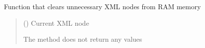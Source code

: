 \documentclass[letterpaper,10pt,english]{sphinxmanual}
\begin{document}
\begin{fulllineitems}
\label{\detokenize{geo_utilities:geo_utilities.clear_xml_node}}
\pysigstartsignatures
{}
\pysigstopsignatures
\sphinxAtStartPar
Function that clears unnecessary XML nodes from RAM memory
\begin{quote}\begin{description}
\sphinxAtStartPar
{} () \textendash{} Current XML node

\sphinxAtStartPar
{}

\sphinxAtStartPar
The method does not return any values

\end{description}\end{quote}

\end{fulllineitems}

\end{document}
